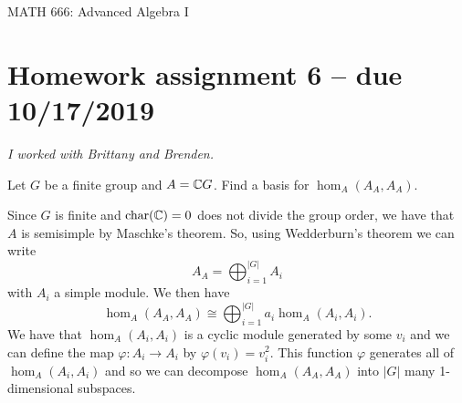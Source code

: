 \documentclass[leqno]{article}
\author{Colin Roberts}
\begin{document}
\begin{center}
  \begin{huge}
    MATH 666: Advanced Algebra I
  \end{huge}
\end{center}

\section*{Homework assignment 6 -- due 10/17/2019}
\noindent \emph{I worked with Brittany and Brenden.}
\setcounter{problem}{20}

\begin{problem}
Let $G$ be a finite group and $A=\mathbb{C} G$. Find a basis for $\hom_A(A_A,A_A)$.
\end{problem}
\begin{solution}
Since $G$ is finite and $\textrm{char}(\mathbb{C})=0$ does not divide the group order, we have that $A$ is semisimple by Maschke's theorem. So, using Wedderburn's theorem we can write 
\[
A_A = \bigoplus_{i=1}^{|G|} A_i
\]
with $A_i$ a simple module.  We then have
\[
\hom_A (A_A,A_A)\cong \bigoplus_{i=1}^{|G|} a_i \hom_A(A_i,A_i).
\]
We have that $\hom_A(A_i,A_i)$ is a cyclic module generated by some $v_i$ and we can define the map $\varphi \colon A_i \to A_i$ by $\varphi(v_i)=v_i^2$. This function $\varphi$ generates all of $\hom_A(A_i,A_i)$ and so we can decompose $\hom_A(A_A,A_A)$ into $|G|$ many 1-dimensional subspaces.
\end{solution}
\end{document}
